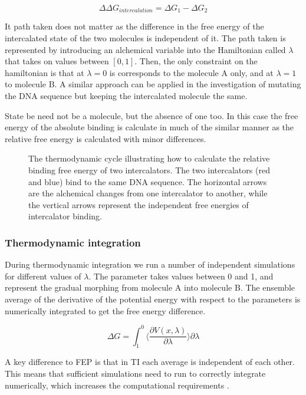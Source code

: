 \documentclass[11pt, a4paper]{report}
\begin{document}
\begin{equation}
  \Delta \Delta G_{intercalation} = \Delta G_{1} - \Delta G_{2} 
\end{equation}

It path taken does not matter as the difference in the free energy of the intercalated state of the two molecules is independent of it. The path taken is represented by introducing an alchemical variable into the Hamiltonian called $\lambda$ that takes on values between $[0, 1]$. Then, the only constraint on the hamiltonian is that at $\lambda = 0$ is corresponds to the molecule A only, and at $\lambda = 1$ to molecule B. A similar approach can be applied in the investigation of mutating the DNA sequence but keeping the intercalated molecule the same.

State be need not be a molecule, but the absence of one too. In this case the free energy of the absolute binding is calculate in much of the similar manner as the relative free energy is calculated with minor differences.

\begin{figure}
  \centering
  
  \caption{The thermodynamic cycle illustrating how to calculate the relative binding free energy of two intercalators. The two intercalators (red and blue) bind to the same DNA sequence. The horizontal arrows are the alchemical changes from one intercalator to another, while the vertical arrows represent the independent free energies of intercalator binding.}
  \label{fig:tiescycle}
\end{figure}

\subsubsection{Thermodynamic integration}

During thermodynamic integration we run a number of independent simulations for different values of $\lambda$. The parameter takes values between 0 and 1, and represent the gradual morphing from molecule A into molecule B. The ensemble average of the derivative of the potential energy with respect to the parameters is numerically integrated to get the free energy difference. 

\begin{equation}
  \Delta G = \int_{1}^{0} \langle \frac{\partial V (x, \lambda)}{\partial \lambda} \rangle \partial \lambda
\end{equation}

A key difference to FEP is that in TI each average is independent of each other. This means that sufficient simulations need to run to correctly integrate numerically, which increases the computational requirements \cite{chipot2002free}.
\end{document}
